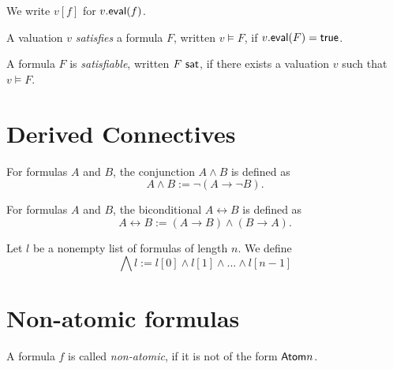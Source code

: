\begin{notation}
    \label{Valuation.eval_notation}
    \leanok
    We write $v[f]$ for $v.\mathsf{eval}(f)$.
\end{notation}

\begin{definition}
    \label{Satisfies}
    \leanok
    A valuation $v$ \emph{satisfies} a formula $F$, written $v \models F$, if $v.\mathsf{eval}(F) = \mathsf{true}$.
\end{definition}

\begin{definition}
    \label{Satisfiable}
    \leanok
    A formula $F$ is \emph{satisfiable}, written $F \ \mathsf{sat}$, if there exists a valuation $v$ such that $v \models F$.
\end{definition}

\section{Derived Connectives}

\begin{definition}
    \label{And}
    \leanok
    For formulas $A$ and $B$, the conjunction $A \wedge B$ is defined as
    \[
    A \wedge B := \neg (A \to \neg B).
    \]
\end{definition}

\begin{definition}
    \label{Iff}
    \leanok
    For formulas $A$ and $B$, the biconditional $A \leftrightarrow B$ is defined as
    \[
    A \leftrightarrow B := (A \to B) \wedge (B \to A).
    \]
\end{definition}

\begin{definition}
    \label{BigAnd}
    \leanok
    Let $l$ be a nonempty list of formulas of length $n$. We define
    \[
    \bigwedge l := l[0] \land l[1] \land ... \land l[n - 1]
    \]
\end{definition}

\section{Non-atomic formulas}

\begin{definition}
    \label{NonAtomic}
    \leanok
    A formula $f$ is called \emph{non-atomic}, if it is not of the form $\mathsf{Atom}{n}$.
\end{definition}


